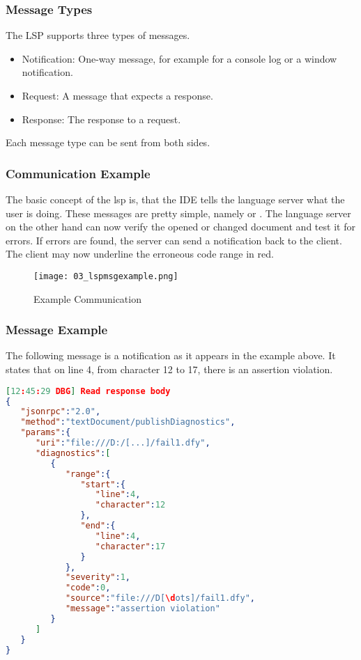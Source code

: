 \subsubsection{Message Types}
The LSP supports three types of messages.
\begin{itemize}
    \item Notification: One-way message, for example for a console log or a window notification.
    \item Request: A message that expects a response.
    \item Response: The response to a request.
\end{itemize}
Each message type can be sent from both sides.

\subsubsection{Communication Example}
The basic concept of the lsp is, that the IDE tells the language server what the user is doing. These messages are pretty simple, namely  or . The language server on the other hand can now verify the opened or changed document and test it for errors. If errors are found, the server can send a  notification back to the client. The client may now underline the erroneous code range in red. \cite{lspspec}

\begin{figure}[h]
    \centering
    \texttt{[image: 03\_lspmsgexample.png]}
    \caption{Example Communication}
    \label{fig:lspmsgexample}
\end{figure}

\subsubsection{Message Example}
The following message is a  notification as it appears in the example above. It states that on line 4, from character 12 to 17, there is an assertion violation.\\


\begin{lstlisting}[language=json, caption={LSP Message Example}, captionpos=b, label={lst:lspjsonmsg}]
[12:45:29 DBG] Read response body
{
   "jsonrpc":"2.0",
   "method":"textDocument/publishDiagnostics",
   "params":{
      "uri":"file:///D:/[...]/fail1.dfy",
      "diagnostics":[
         {
            "range":{
               "start":{
                  "line":4,
                  "character":12
               },
               "end":{
                  "line":4,
                  "character":17
               }
            },
            "severity":1,
            "code":0,
            "source":"file:///D[\dots]/fail1.dfy",
            "message":"assertion violation"
         }
      ]
   }
}
\end{lstlisting}

